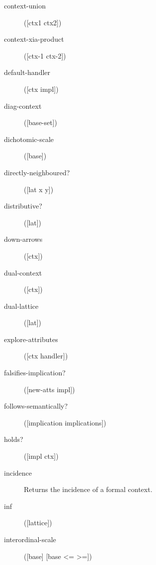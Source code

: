 \begin{description}
  \item[context-union]
([ctx1 ctx2])



  \item[context-xia-product]
([ctx-1 ctx-2])



  \item[default-handler]
([ctx impl])



  \item[diag-context]
([base-set])



  \item[dichotomic-scale]
([base])



  \item[directly-neighboured?]
([lat x y])



  \item[distributive?]
([lat])



  \item[down-arrows]
([ctx])



  \item[dual-context]
([ctx])



  \item[dual-lattice]
([lat])



  \item[explore-attributes]
([ctx handler])



  \item[falsifies-implication?]
([new-atts impl])



  \item[follows-semantically?]
([implication implications])



  \item[holds?]
([impl ctx])



  \item[incidence]


Returns the incidence of a formal context.

  \item[inf]
([lattice])



  \item[interordinal-scale]
([base] [base <= >=])




\end{description}
